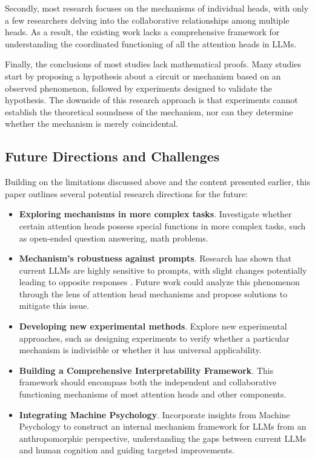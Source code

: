 \documentclass{article}
\begin{document}
Secondly, most research focuses on the mechanisms of individual heads, with only a few researchers delving into the collaborative relationships among multiple heads. As a result, the existing work lacks a comprehensive framework for understanding the coordinated functioning of all the attention heads in LLMs.

Finally, the conclusions of most studies lack mathematical proofs. Many studies start by proposing a hypothesis about a circuit or mechanism based on an observed phenomenon, followed by experiments designed to validate the hypothesis. The downside of this research approach is that experiments cannot establish the theoretical soundness of the mechanism, nor can they determine whether the mechanism is merely coincidental.

\subsection{Future Directions and Challenges}
Building on the limitations discussed above and the content presented earlier, this paper outlines several potential research directions for the future:
\begin{itemize}
    \item \textbf{Exploring mechanisms in more complex tasks}. Investigate whether certain attention heads possess special functions in more complex tasks, such as open-ended question answering, math problems.
    
    \item \textbf{Mechanism's robustness against prompts}. Research has shown that current LLMs are highly sensitive to prompts, with slight changes potentially leading to opposite responses \citep{xFinder_24_arXiv_IAAR}. Future work could analyze this phenomenon through the lens of attention head mechanisms and propose solutions to mitigate this issue.
    
    \item \textbf{Developing new experimental methods}. Explore new experimental approaches, such as designing experiments to verify whether a particular mechanism is indivisible or whether it has universal applicability.
    
    \item \textbf{Building a Comprehensive Interpretability Framework}. This framework should encompass both the independent and collaborative functioning mechanisms of most attention heads and other components.
    
    \item \textbf{Integrating Machine Psychology}. Incorporate insights from Machine Psychology to construct an internal mechanism framework for LLMs from an anthropomorphic perspective, understanding the gaps between current LLMs and human cognition and guiding targeted improvements.
\end{itemize}
\end{document}
